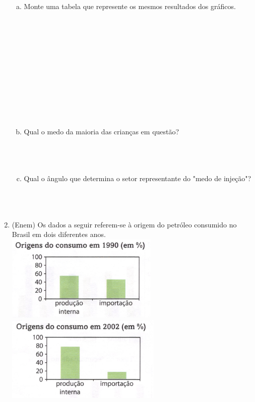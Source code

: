 \documentclass[a4paper,14pt]{article}
\begin{document}
\begin{multicols}{2}
\begin{enumerate}
			\begin{enumerate}[a)]
				\item Monte uma tabela que represente os mesmos resultados dos gráficos. \\\\\\\\\\\\\\\\\\\\\\\\
				\item Qual o medo da maioria das crianças em questão? \\\\\\\\
				\item Qual o ângulo que determina o setor representante do "medo de injeção"? \\\\\\\\
			\end{enumerate}
			\item (Enem) Os dados a seguir referem-se à origem do petróleo consumido no Brasil em dois diferentes anos. \\
			\includegraphics[width=1\linewidth]{6FMA119_imagens/imagem9}
			\\
			\includegraphics[width=1\linewidth]{6FMA119_imagens/imagem10}

\end{enumerate}
\end{multicols}
\end{document}
